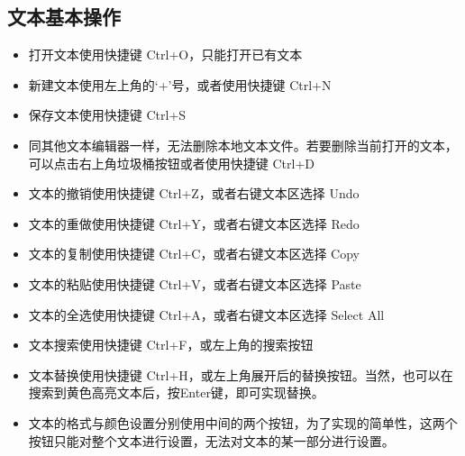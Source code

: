 \documentclass{./source/Report}
\begin{document}
\subsection{文本基本操作}
\begin{itemize}
    \item 打开文本使用快捷键 Ctrl+O，只能打开已有文本
    \item 新建文本使用左上角的‘+’号，或者使用快捷键 Ctrl+N
    \item 保存文本使用快捷键 Ctrl+S
    \item 同其他文本编辑器一样，无法删除本地文本文件。若要删除当前打开的文本，可以点击右上角垃圾桶按钮或者使用快捷键 Ctrl+D
    \item 文本的撤销使用快捷键 Ctrl+Z，或者右键文本区选择 Undo
    \item 文本的重做使用快捷键 Ctrl+Y，或者右键文本区选择 Redo
    \item 文本的复制使用快捷键 Ctrl+C，或者右键文本区选择 Copy
    \item 文本的粘贴使用快捷键 Ctrl+V，或者右键文本区选择 Paste
    \item 文本的全选使用快捷键 Ctrl+A，或者右键文本区选择 Select All    
    \item 文本搜索使用快捷键 Ctrl+F，或左上角的搜索按钮
    \item 文本替换使用快捷键 Ctrl+H，或左上角展开后的替换按钮。当然，也可以在搜索到黄色高亮文本后，按Enter键，即可实现替换。
    \item 文本的格式与颜色设置分别使用中间的两个按钮，为了实现的简单性，这两个按钮只能对整个文本进行设置，无法对文本的某一部分进行设置。
\end{itemize}
\end{document}
